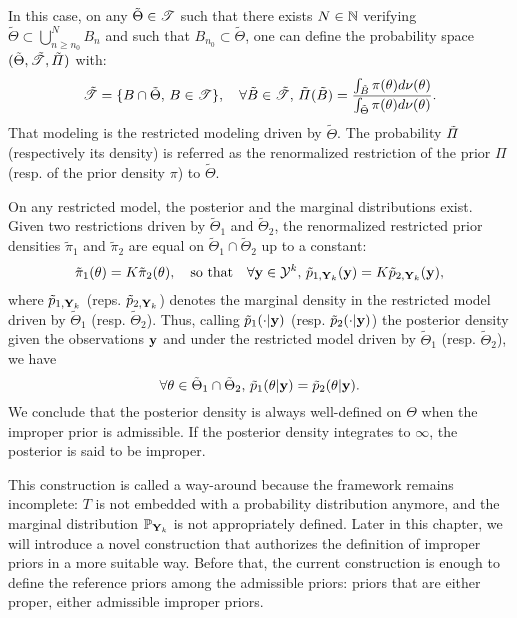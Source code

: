 In this case, on any $\tilde\Theta\in\mathscr{T}$ such that there exists $N\in\mathbb{N}$ verifying $\tilde\Theta\subset\bigcup_{n\geq n_0}^NB_n$ and such that $B_{n_0}\subset\tilde\Theta$, one can define the probability space $(\tilde\Theta,\tilde{\mathscr{T}},\tilde\varPi)$ with:
    \begin{equation}
        \tilde{\mathscr{T}} = \{B\cap\tilde\Theta,\,B\in\mathscr{T}\},\quad\forall \tilde B\in\tilde{\mathscr{T}},\,\tilde\varPi(\tilde B) = \frac{\int_{\tilde B}\pi(\theta)d\nu(\theta)}{\int_{\tilde\Theta}\pi(\theta)d\nu(\theta)}.
    \end{equation}
That modeling is the restricted modeling driven by $\tilde\Theta$. 
The probability $\Tilde\varPi$ (respectively its density) is referred as the renormalized restriction of the prior $\varPi$ (resp. of the prior density $\pi$) to $\tilde\Theta$.

On any restricted model, the posterior and the marginal distributions exist. 
Given two restrictions driven by $\tilde\Theta_1$ and $\tilde\Theta_2$, the renormalized restricted prior densities $\tilde\pi_1$ and $\tilde\pi_2$ are equal on $\tilde\Theta_1\cap\tilde\Theta_2$ up to a constant:
    \begin{equation}
        \tilde\pi_1(\theta) = K\tilde\pi_2(\theta),\quad\text{so that}\quad \forall \mathbf{y}\in\mathcal{Y}^k,\,\tilde p_{1,\mathbf{Y}_k}(\mathbf{y}) = K\tilde p_{2,\mathbf{Y}_k}(\mathbf{y}),
    \end{equation}
where $\tilde p_{1,\mathbf{Y}_k}$ (reps. $\tilde p_{2,\mathbf{Y}_k}$) denotes the marginal density in the restricted model driven by $\tilde\Theta_1$ (resp. $\tilde\Theta_2$). Thus, calling $\tilde p_1(\cdot | \mathbf{y})$ (resp. $\tilde p_2(\cdot | \mathbf{y})$) the posterior density given the observations $\mathbf{y}$ and under the restricted model driven by $\tilde\Theta_1$ (resp. $\tilde\Theta_2$), we have
    \begin{equation}
        \forall\theta\in\tilde\Theta_1\cap\tilde\Theta_2,\, \tilde p_1(\theta | \mathbf{y}) =\tilde p_2(\theta | \mathbf{y}).
    \end{equation}
We conclude that the posterior density is always well-defined on $\Theta$ when the improper prior is admissible.
If the posterior density integrates to $\infty$, the posterior is said to be improper.



This construction is called a way-around because the framework remains incomplete: $T$ is not embedded with a probability distribution  anymore, and %
the marginal distribution $\mathbb{P}_{\mathbf{Y}_k}$ is not appropriately defined. 
Later in this chapter, we will introduce a novel construction that authorizes the definition of improper priors in a more suitable way.
Before that, the current construction is enough to define the reference priors among the admissible priors: priors that are either proper, either admissible improper priors.


